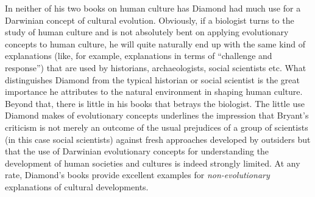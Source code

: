 In neither of his two books on human culture has Diamond had much use
for a Darwinian concept of cultural evolution. Obviously, if a
biologist turns to the study of human culture and is not absolutely
bent on applying evolutionary concepts to human culture, he will quite
naturally end up with the same kind of explanations (like, for
example, explanations in terms of ``challenge and response'') that are
used by historians, archaeologists, social scientists etc. What
distinguishes Diamond from the typical historian or social scientist
is the great importance he attributes to the natural environment in
shaping human culture. Beyond that, there is little in his books that
betrays the biologist. The little use Diamond makes of evolutionary
concepts underlines the impression that Bryant's criticism is not
merely an outcome of the usual prejudices of a group of scientists (in
this case social scientists) against fresh approaches developed by
outsiders but that the use of Darwinian evolutionary concepts for
understanding the development of human societies and cultures is
indeed strongly limited. At any rate, Diamond's books provide
excellent examples for {\em non-evolutionary} explanations of cultural
developments.

